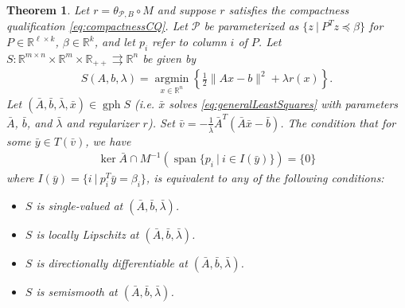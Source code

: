 \documentclass[reqno]{amsart}
\newtheorem{theorem}[proposition]{Theorem}
\numberwithin{equation}{section}
\newcommand{\R}{\mathbb{R}}
\newcommand{\pol}{\mathcal{P}}
\newcommand{\tpb}{\theta_{\mathcal{P},B}}
\newcommand{\argmin}{\operatorname{argmin}}
\newcommand{\gph}{\operatorname{gph}}
\begin{document}
\begin{theorem}\label{thm:plqstab}
    Let $r = \tpb \circ M$ and suppose $r$ satisfies the compactness qualification \eqref{eq:compactnessCQ}.
    Let $\pol$ be parameterized as $\{z \ | \ P^Tz \preceq \beta\}$ for $P \in \R^{\ell \times k}$, $\beta \in \R^{k}$, and let $p_i$ refer to column $i$ of $P$.
    Let $S : \R^{m \times n} \times \R^m \times \R_{++} \rightrightarrows \R^n$ be given by
    \begin{align*}
        S(A, b,\lambda)= \underset{x \in \R^n}{\argmin} \left\{ \frac{1}{2} \lVert Ax-b \rVert^2 +\lambda r(x)
        \right\}.
    \end{align*} 
    Let $(\bar{A}, \bar{b}, \bar{\lambda}, \bar{x}) \in \gph S$ (i.e. $\bar{x}$ solves \eqref{eq:generalLeastSquares} with parameters $\bar{A}$, $\bar{b}$, and $\bar{\lambda}$ and regularizer $r$).
    Set $\bar{v} = -\frac{1}{\bar{\lambda}} \bar{A}^T(\bar{A}\bar{x} - \bar{b})$.
    The condition that for some $\bar y \in T(\bar v)$, we have
    \begin{align}\label{eq:CQPLQM}
        \ker \bar{A} \cap M^{-1}(\operatorname{span}\{p_i \ | \ i \in I(\bar{y})\}) = \{0\}
    \end{align} where $I(\bar{y}) = \{i \ | \ p_i^T \bar y  = \beta_i\}$, 
    is equivalent to any of the following conditions:
\begin{itemize}
        \item[(a)] $S$ is single-valued at $(\bar{A}, \bar{b}, \bar{\lambda})$.
        \item[(b)] $S$ is locally Lipschitz at $(\bar{A}, \bar{b}, \bar{\lambda})$.
        \item[(c)] $S$ is directionally differentiable at $(\bar{A}, \bar{b}, \bar{\lambda})$.
        \item[(d)] $S$ is semismooth at $(\bar{A}, \bar{b}, \bar{\lambda})$. 
\end{itemize}
\end{theorem}
\end{document}
